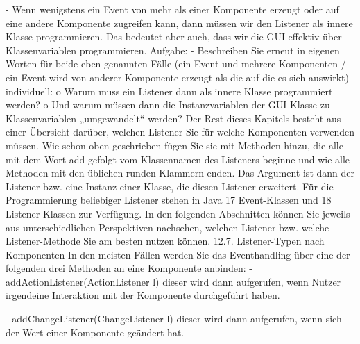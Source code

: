 -	Wenn wenigstens ein Event von mehr als einer Komponente erzeugt oder auf eine andere Komponente zugreifen kann, dann müssen wir den Listener als innere Klasse programmieren. Das bedeutet aber auch, dass wir die GUI effektiv über Klassenvariablen programmieren.
Aufgabe:
-	Beschreiben Sie erneut in eigenen Worten für beide eben genannten Fälle (ein Event und mehrere Komponenten / ein Event wird von anderer Komponente erzeugt als die auf die es sich auswirkt) individuell:
o	Warum muss ein Listener dann als innere Klasse programmiert werden? 
o	Und warum müssen dann die Instanzvariablen der GUI-Klasse zu Klassenvariablen „umgewandelt“ werden?
Der Rest dieses Kapitels besteht aus einer Übersicht darüber, welchen Listener Sie für welche Komponenten verwenden müssen. Wie schon oben geschrieben fügen Sie sie mit Methoden hinzu, die alle mit dem Wort add gefolgt vom Klassennamen des Listeners beginne und wie alle Methoden mit den üblichen runden Klammern enden. Das Argument ist dann der Listener bzw. eine Instanz einer Klasse, die diesen Listener erweitert.
Für die Programmierung beliebiger Listener stehen in Java 17 Event-Klassen und 18 Listener-Klassen zur Verfügung. In den folgenden Abschnitten können Sie jeweils aus unterschiedlichen Perspektiven nachsehen, welchen Listener bzw. welche Listener-Methode Sie am besten nutzen können.
12.7.	Listener-Typen nach Komponenten
In den meisten Fällen werden Sie das Eventhandling über eine der folgenden drei Methoden an eine Komponente anbinden:
-	addActionListener(ActionListener l)
dieser wird dann aufgerufen, wenn Nutzer irgendeine Interaktion mit der Komponente durchgeführt haben.

-	addChangeListener(ChangeListener l)
dieser wird dann aufgerufen, wenn sich der Wert einer Komponente geändert hat.

